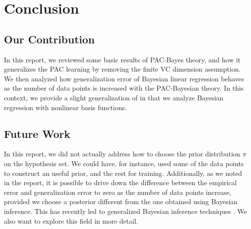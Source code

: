\section{Conclusion}

\subsection{Our Contribution}

In this report, we reviewed some basic results of PAC-Bayes theory, and how it
generalizes the PAC learning by removing the finite VC dimension assumption. We
then analyzed how generalization error of Bayesian linear regression behaves as
the number of data points is increased with the PAC-Bayesian theory. In this
context, we provide a slight generalization of \cite{germain2016pac} in that we
analyze Bayesian regression with nonlinear basis functions.

\subsection{Future Work}

In this report, we did not actually address how to choose the prior distribution
$\pi$ on the hypothesis set. We could have, for instance, used some of the data
points to construct an useful prior, and the rest for training. Additionally, as
we noted in the report, it is possible to drive down the difference between the
empirical error and generalization error to zero as the number of data points
increase, provided we choose a posterior different from the one obtained using
Bayesian inference. This has recently led to generalized Bayesian inference
techniques \citep{guedj2019primer}. We also want to explore this field in more
detail.
